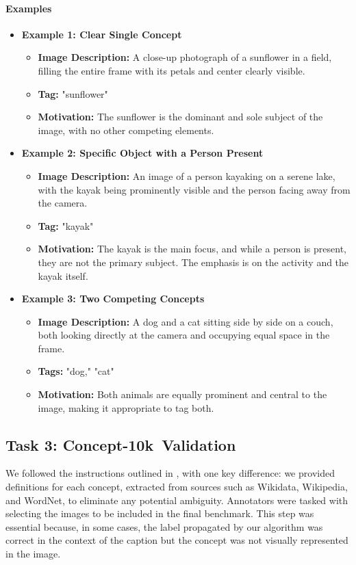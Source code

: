 \documentclass[11pt]{article}
\newcommand{\benchmark}{Concept-10k}
\begin{document}
\paragraph{Examples}
\begin{itemize}
    \item \textbf{Example 1: Clear Single Concept}
    \begin{itemize}[label=-]
        \item \textbf{Image Description:} A close-up photograph of a sunflower in a field, filling the entire frame with its petals and center clearly visible.
        \item \textbf{Tag:} "sunflower"
        \item \textbf{Motivation:} The sunflower is the dominant and sole subject of the image, with no other competing elements.
    \end{itemize}

    \item \textbf{Example 2: Specific Object with a Person Present}
    \begin{itemize}[label=-]
        \item \textbf{Image Description:} An image of a person kayaking on a serene lake, with the kayak being prominently visible and the person facing away from the camera.
        \item \textbf{Tag:} "kayak"
        \item \textbf{Motivation:} The kayak is the main focus, and while a person is present, they are not the primary subject. The emphasis is on the activity and the kayak itself.
    \end{itemize}

    \item \textbf{Example 3: Two Competing Concepts}
    \begin{itemize}[label=-]
        \item \textbf{Image Description:} A dog and a cat sitting side by side on a couch, both looking directly at the camera and occupying equal space in the frame.
        \item \textbf{Tags:} "dog," "cat"
        \item \textbf{Motivation:} Both animals are equally prominent and central to the image, making it appropriate to tag both.
    \end{itemize}
\end{itemize}

\subsection{Task 3: \benchmark~Validation}
\label{sec:appendix-bench}
We followed the instructions outlined in \cite{krizhevsky2009learning}, with one key difference: we provided definitions for each concept, extracted from sources such as Wikidata, Wikipedia, and WordNet, to eliminate any potential ambiguity. Annotators were tasked with selecting the images to be included in the final benchmark. This step was essential because, in some cases, the label propagated by our algorithm was correct in the context of the caption but the concept was not visually represented in the image.
\end{document}
